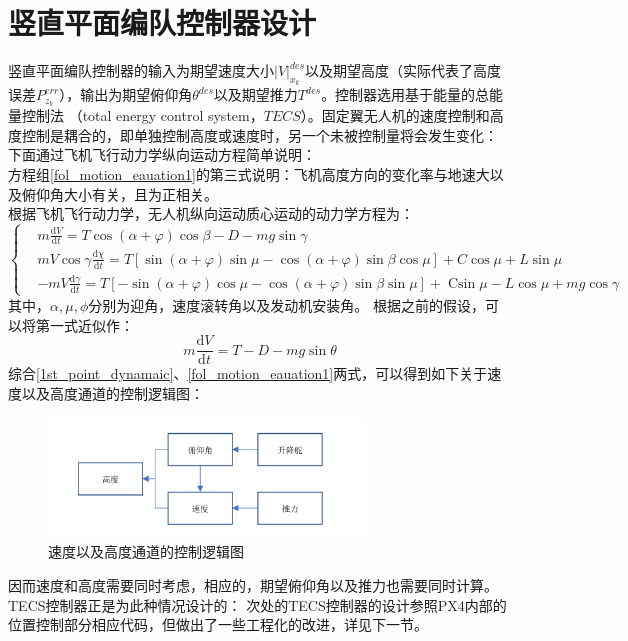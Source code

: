 \section{竖直平面编队控制器设计}
竖直平面编队控制器的输入为期望速度大小$|V|_{x_k}^{des}$以及期望高度（实际代表了高度误差$P_{z_b}^{err}$），输出为期望俯仰角$\theta^{des}$以及期望推力$T^{des}$。控制器选用基于能量的总能量控制法
（total energy control system，$TECS$）。固定翼无人机的速度控制和高度控制是耦合的，即单独控制高度或速度时，另一个未被控制量将会发生变化：
下面通过飞机飞行动力学纵向运动方程简单说明：
\\方程组\ref{fol_motion_eauation1}的第三式说明：飞机高度方向的变化率与地速大以及俯仰角大小有关，且为正相关。
\\根据飞机飞行动力学\cite{Fangzhenping2005}，无人机纵向运动质心运动的动力学方程为：
\begin{equation}
    \left\{
    \begin{aligned}
    &m \frac{\mathrm{d} V}{\mathrm{d} t}=T \cos (\alpha+\varphi) \cos \beta-D-m g \sin \gamma\\
    &m V \cos \gamma \frac{\mathrm{d} \chi}{\mathrm{d} t}=T[\sin (\alpha+\varphi) \sin \mu-\cos (\alpha+\varphi) \sin \beta \cos \mu]+C \cos \mu+L \sin \mu\\
    &-m V \frac{\mathrm{d} \gamma}{\mathrm{d} t}=T[-\sin (\alpha+\varphi) \cos \mu-\cos (\alpha+\varphi) \sin \beta \sin \mu]+\operatorname{Csin} \mu-L \cos \mu+m g \cos \gamma
    \end{aligned}
    \right .
    \label{point_dynamaic}
\end{equation}
其中，$\alpha,\mu,\phi$分别为迎角，速度滚转角以及发动机安装角。
根据之前的假设，可以将第一式近似作：
\begin{equation}
    m \frac{\mathrm{d} V}{\mathrm{d} t}=T-D-m g \sin \theta
    \label{1st_point_dynamaic}
\end{equation}
综合\ref{1st_point_dynamaic}、\ref{fol_motion_eauation1}两式，可以得到如下关于速度以及高度通道的控制逻辑图：
\begin{figure}[H]
    \centering
    \includegraphics[width=0.75\textwidth]{figures/c3/relation_theta_thrust}
    \caption{速度以及高度通道的控制逻辑图}\label{fig:relation_theta_thrust}
\end{figure}
因而速度和高度需要同时考虑，相应的，期望俯仰角以及推力也需要同时计算。TECS控制器正是为此种情况设计的：
次处的TECS控制器的设计参照PX4内部的位置控制部分相应代码，但做出了一些工程化的改进，详见下一节。

